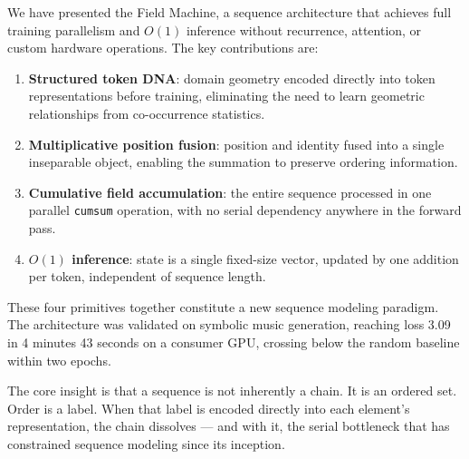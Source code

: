 \documentclass[11pt]{article}
\begin{document}
We have presented the Field Machine, a sequence architecture that achieves full training parallelism and $O(1)$ inference without recurrence, attention, or custom hardware operations. The key contributions are:

\begin{enumerate}
    \item \textbf{Structured token DNA}: domain geometry encoded directly into token representations before training, eliminating the need to learn geometric relationships from co-occurrence statistics.

    \item \textbf{Multiplicative position fusion}: position and identity fused into a single inseparable object, enabling the summation to preserve ordering information.

    \item \textbf{Cumulative field accumulation}: the entire sequence processed in one parallel \texttt{cumsum} operation, with no serial dependency anywhere in the forward pass.

    \item \textbf{$O(1)$ inference}: state is a single fixed-size vector, updated by one addition per token, independent of sequence length.
\end{enumerate}

These four primitives together constitute a new sequence modeling paradigm. The architecture was validated on symbolic music generation, reaching loss 3.09 in 4 minutes 43 seconds on a consumer GPU, crossing below the random baseline within two epochs.

The core insight is that a sequence is not inherently a chain. It is an ordered set. Order is a label. When that label is encoded directly into each element's representation, the chain dissolves — and with it, the serial bottleneck that has constrained sequence modeling since its inception.
\end{document}
